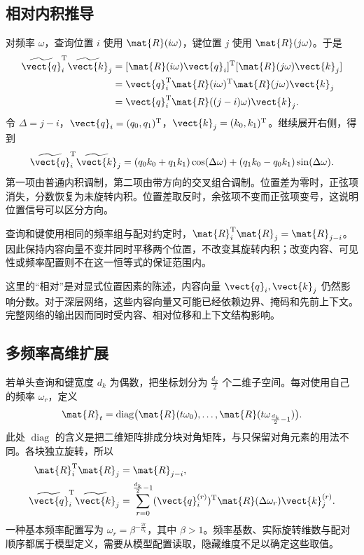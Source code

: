 \documentclass[../textbook.tex]{subfiles}
\begin{document}
\subsection{相对内积推导}
对频率 $\omega$，查询位置 $i$ 使用 $\mat{R}(i\omega)$，键位置 $j$ 使用 $\mat{R}(j\omega)$。于是
\begin{align}
 \widetilde{\vect{q}}_i^{\mathrm{T}}\widetilde{\vect{k}}_j
 &=[\mat{R}(i\omega)\vect{q}_i]^{\mathrm{T}}[\mat{R}(j\omega)\vect{k}_j]\\
 &=\vect{q}_i^{\mathrm{T}}\mat{R}(i\omega)^{\mathrm{T}}\mat{R}(j\omega)\vect{k}_j\\
 &=\vect{q}_i^{\mathrm{T}}\mat{R}((j-i)\omega)\vect{k}_j.
 \label{eq:pos-relative-dot}
\end{align}
令 $\Delta=j-i$，$\vect{q}_i=(q_0,q_1)^{\mathrm{T}}$，$\vect{k}_j=(k_0,k_1)^{\mathrm{T}}$。继续展开右侧，得到
\begin{equation}
 \widetilde{\vect{q}}_i^{\mathrm{T}}\widetilde{\vect{k}}_j
 =(q_0k_0+q_1k_1)\cos(\Delta\omega)
 +(q_1k_0-q_0k_1)\sin(\Delta\omega).
 \label{eq:pos-rope-expanded}
\end{equation}
第一项由普通内积调制，第二项由带方向的交叉组合调制。位置差为零时，正弦项消失，分数恢复为未旋转内积。位置差取反时，余弦项不变而正弦项变号，这说明位置信号可以区分方向。

\begin{note}[旋转内积的相对位置性质]
查询和键使用相同的频率组与配对约定时，$\mat{R}_i^{\mathrm{T}}\mat{R}_j=\mat{R}_{j-i}$。因此保持内容向量不变并同时平移两个位置，不改变其旋转内积；改变内容、可见性或频率配置则不在这一恒等式的保证范围内。
\end{note}

这里的“相对”是对显式位置因素的陈述，内容向量 $\vect{q}_i,\vect{k}_j$ 仍然影响分数。对于深层网络，这些内容向量又可能已经依赖边界、掩码和先前上下文。完整网络的输出因而同时受内容、相对位移和上下文结构影响。

\subsection{多频率高维扩展}
若单头查询和键宽度 $d_k$ 为偶数，把坐标划分为 $\frac{d_k}{2}$ 个二维子空间。每对使用自己的频率 $\omega_r$，定义
\begin{equation}
 \mat{R}_t=\operatorname{diag}\bigl(\mat{R}(t\omega_0),\ldots,\mat{R}(t\omega_{\frac{d_k}{2}-1})\bigr).
\end{equation}
此处 $\operatorname{diag}$ 的含义是把二维矩阵排成分块对角矩阵，与只保留对角元素的用法不同。各块独立旋转，所以
\begin{equation}
 \begin{aligned}
  \mat{R}_i^{\mathrm{T}}\mat{R}_j&=\mat{R}_{j-i},\\
  \widetilde{\vect{q}}_i^{\mathrm{T}}\widetilde{\vect{k}}_j
  &=\sum_{r=0}^{\frac{d_k}{2}-1}(\vect{q}_i^{(r)})^{\mathrm{T}}\mat{R}(\Delta\omega_r)\vect{k}_j^{(r)}.
 \end{aligned}
\end{equation}
一种基本频率配置写为 $\omega_r=\beta^{-\frac{2r}{d_k}}$，其中 $\beta>1$。频率基数、实际旋转维数与配对顺序都属于模型定义，需要从模型配置读取，隐藏维度不足以确定这些取值。
\end{document}
